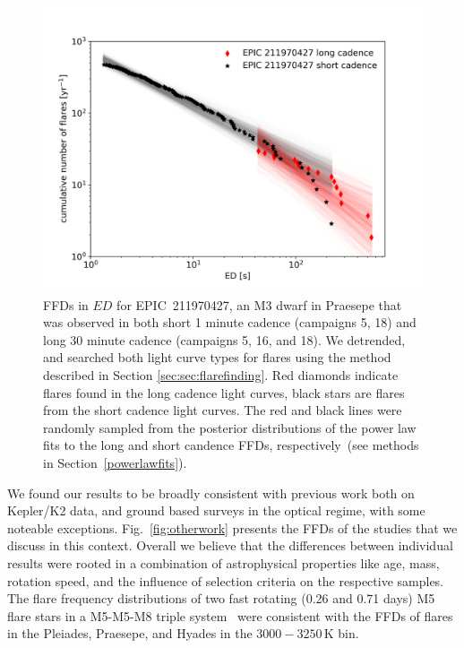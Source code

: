 \documentclass{aa}
\begin{document}
\begin{figure}[ht!]
    \centering
    \includegraphics[width=\hsize]{pics/FFDs/EPIC211970427_long_vs_short_cadence_ffd.png}
    \caption{FFDs in $ED$ for EPIC~211970427, an M3 dwarf in Praesepe that was observed in both short 1 minute cadence (campaigns 5, 18) and long 30 minute cadence (campaigns 5, 16, and 18). We detrended, and searched both light curve types for flares using the method described in Section \ref{sec:sec:flarefinding}. Red diamonds indicate flares found in the long cadence light curves, black stars are flares from the short cadence light curves. The red and black lines were randomly sampled from the posterior distributions of the power law fits to the long and short candence FFDs, respectively~(see methods in Section~\ref{powerlawfits}).}          
    \label{fig:shortlong}
\end{figure}
We found our results to be broadly consistent with previous work both on Kepler/K2 data, and ground based surveys in the optical regime, with some noteable exceptions. Fig.~\ref{fig:otherwork} presents the FFDs of the studies that we discuss in this context. Overall we believe that the differences between individual results were rooted in a combination of astrophysical properties like age, mass, rotation speed, and the influence of selection criteria on the respective samples. 
\\
The flare frequency distributions of two fast rotating (0.26 and 0.71 days) M5 flare stars in a M5-M5-M8 triple system~\citep{lurie2015} were consistent with the FFDs of flares in the Pleiades, Praesepe, and Hyades in the $3000-3250\,$K bin. 
\end{document}
